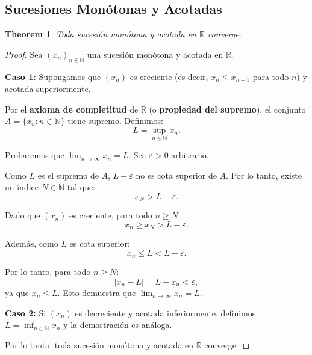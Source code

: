 \documentclass[11pt,a4paper]{article}
\theoremstyle{plain}
\newtheorem{theorem}{Theorem}[section]
\theoremstyle{definition}
\begin{document}
\subsection{Sucesiones Monótonas y Acotadas}

\begin{theorem}
Toda sucesión monótona y acotada en $\mathbb{R}$ converge.
\end{theorem}

\begin{proof}
Sea $(x_n)_{n \in \mathbb{N}}$ una sucesión monótona y acotada en $\mathbb{R}$.

\textbf{Caso 1:} Supongamos que $(x_n)$ es creciente (es decir, $x_n \leq x_{n+1}$ para todo $n$) y acotada superiormente.

Por el \textbf{axioma de completitud} de $\mathbb{R}$ (o \textbf{propiedad del supremo}), el conjunto $A = \{x_n : n \in \mathbb{N}\}$ tiene supremo. Definimos:
\[
L = \sup_{n \in \mathbb{N}} x_n.
\]

Probaremos que $\lim_{n \to \infty} x_n = L$. Sea $\varepsilon > 0$ arbitrario.

Como $L$ es el supremo de $A$, $L - \varepsilon$ no es cota superior de $A$. Por lo tanto, existe un índice $N \in \mathbb{N}$ tal que:
\[
x_N > L - \varepsilon.
\]

Dado que $(x_n)$ es creciente, para todo $n \geq N$:
\[
x_n \geq x_N > L - \varepsilon.
\]

Además, como $L$ es cota superior:
\[
x_n \leq L < L + \varepsilon.
\]

Por lo tanto, para todo $n \geq N$:
\[
|x_n - L| = L - x_n < \varepsilon,
\]
ya que $x_n \leq L$. Esto demuestra que $\lim_{n \to \infty} x_n = L$.

\textbf{Caso 2:} Si $(x_n)$ es decreciente y acotada inferiormente, definimos $L = \inf_{n \in \mathbb{N}} x_n$ y la demostración es análoga.

Por lo tanto, toda sucesión monótona y acotada en $\mathbb{R}$ converge.
\end{proof}
\end{document}

